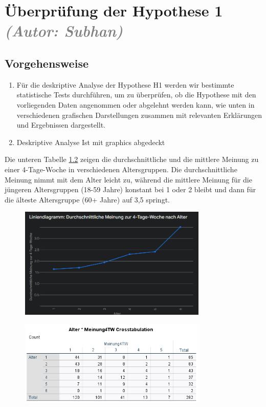 \chapter{Überprüfung der Hypothese 1 \textit{\textcolor{gray}{(Autor: Subhan)}}}
\label{chap:hypothese1}

\section{Vorgehensweise}

\begin{enumerate}
    \item Für die deskriptive Analyse der Hypothese H1 werden wir bestimmte statistische Tests 
    durchführen, um zu überprüfen, ob die Hypothese mit den vorliegenden Daten angenommen oder 
    abgelehnt werden kann, wie unten in verschiedenen grafischen Darstellungen zusammen mit 
    relevanten Erklärungen und Ergebnissen dargestellt.
    \item Deskriptive Analyse Ist mit graphics abgedeckt
\end{enumerate}

Die unteren Tabelle \ref*{fig:h1_tabelle_alter} zeigen die durchschnittliche und die mittlere Meinung zu einer 4-Tage-Woche 
in verschiedenen Altersgruppen. Die durchschnittliche Meinung nimmt mit dem Alter leicht zu, 
während die mittlere Meinung für die jüngeren Altersgruppen (18-59 Jahre) konstant bei 1 oder 2 
bleibt und dann für die älteste Altersgruppe (60+ Jahre) auf 3,5 springt.

\begin{figure}[h]
    \centering
    \includegraphics[width=0.8\textwidth]{04_Artefakte/01_Abbildungen/hypothese_1/h1_linie_alter.png}
     \caption{}
     \label{fig:h1_linie_alter}
\end{figure}

\begin{figure}[h]
    \centering
    \includegraphics[width=0.8\textwidth]{04_Artefakte/01_Abbildungen/hypothese_1/h1_tabelle_alter.png}
    \caption{}
    \label{fig:h1_tabelle_alter}
\end{figure}

